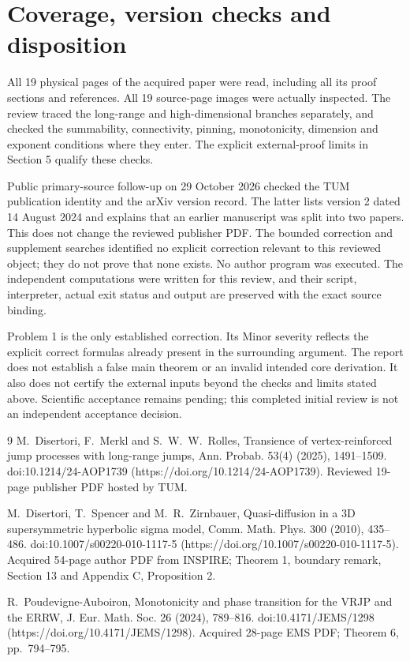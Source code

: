 \documentclass[10pt]{article}
\begin{document}
\section*{Coverage, version checks and disposition}
All 19 physical pages of the acquired paper were read, including all its proof sections and references. All 19 source-page images were actually inspected. The review traced the long-range and high-dimensional branches separately, and checked the summability, connectivity, pinning, monotonicity, dimension and exponent conditions where they enter. The explicit external-proof limits in Section 5 qualify these checks.\par
Public primary-source follow-up on 29 October 2026 checked the TUM publication identity and the arXiv version record. The latter lists version 2 dated 14 August 2024 and explains that an earlier manuscript was split into two papers. This does not change the reviewed publisher PDF. The bounded correction and supplement searches identified no explicit correction relevant to this reviewed object; they do not prove that none exists. No author program was executed. The independent computations were written for this review, and their script, interpreter, actual exit status and output are preserved with the exact source binding.\par
Problem 1 is the only established correction. Its Minor severity reflects the explicit correct formulas already present in the surrounding argument. The report does not establish a false main theorem or an invalid intended core derivation. It also does not certify the external inputs beyond the checks and limits stated above. Scientific acceptance remains pending; this completed initial review is not an independent acceptance decision.\par
9 M. Disertori, F. Merkl and S. W. W. Rolles, Transience of vertex-reinforced jump processes with long-range jumps, Ann. Probab. 53(4) (2025), 1491–1509. doi:10.1214/24-AOP1739 (https://doi.org/10.1214/24-AOP1739). Reviewed 19-page publisher PDF hosted by TUM.\par
M. Disertori, T. Spencer and M. R. Zirnbauer, Quasi-diffusion in a 3D supersymmetric hyperbolic sigma model, Comm. Math. Phys. 300 (2010), 435–486. doi:10.1007/s00220-010-1117-5 (https://doi.org/10.1007/s00220-010-1117-5). Acquired 54-page author PDF from INSPIRE; Theorem 1, boundary remark, Section 13 and Appendix C, Proposition 2.\par
R. Poudevigne-Auboiron, Monotonicity and phase transition for the VRJP and the ERRW, J. Eur. Math. Soc. 26 (2024), 789–816. doi:10.4171/JEMS/1298 (https://doi.org/10.4171/JEMS/1298). Acquired 28-page EMS PDF; Theorem 6, pp. 794–795.\par
\end{document}
